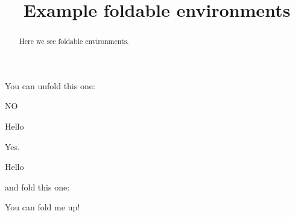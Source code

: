 \documentclass{ximera}
\title{Example foldable environments}
\begin{document}
\begin{abstract}
  Here we see foldable environments.
\end{abstract}
\maketitle

You can unfold this one:

\begin{foldable}
NO
\begin{unfoldable}
  Hello
\end{unfoldable}
Yes.
\end{foldable}
\begin{expandable}
  Hello
 \begin{center}
 \end{center}
\end{expandable}



and fold this one:

\begin{foldable}
  You can fold me up!
\end{foldable}
\end{document}
